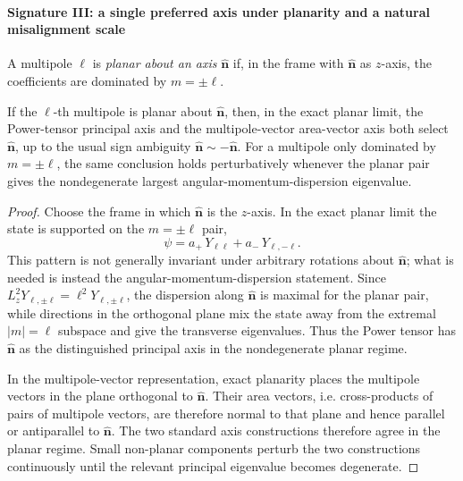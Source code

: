 \documentclass[12pt,a4paper]{article}
\begin{document}
\paragraph{Signature III: a single preferred axis under planarity and a natural misalignment scale}
\label{p8:subsec:bh-axis}

\begin{definition}
\label{p8:def:bh-planar}
A multipole $\ell$ is \emph{planar about an axis} $\hat{\mathbf n}$ if, in the frame with
$\hat{\mathbf n}$ as $z$-axis, the coefficients are dominated by $m=\pm\ell$.
\end{definition}


\begin{proposition}
\label{p8:prop:bh-bridge}
If the \(\ell\)-th multipole is planar about \(\hat{\mathbf n}\), then, in the exact planar limit, the Power-tensor principal axis and the multipole-vector area-vector axis both select \(\hat{\mathbf n}\), up to the usual sign ambiguity \(\hat{\mathbf n}\sim-\hat{\mathbf n}\).  For a multipole only dominated by \(m=\pm\ell\), the same conclusion holds perturbatively whenever the planar pair gives the nondegenerate largest angular-momentum-dispersion eigenvalue.
\end{proposition}
\begin{proof}
Choose the frame in which \(\hat{\mathbf n}\) is the \(z\)-axis.  In the exact planar limit the state is supported on the \(m=\pm\ell\) pair,
\[
\psi=a_+\,Y_{\ell\ell}+a_-\,Y_{\ell,-\ell}.
\]
This pattern is not generally invariant under arbitrary rotations about \(\hat{\mathbf n}\); what is needed is instead the angular-momentum-dispersion statement.  Since \(L_z^2Y_{\ell,\pm\ell}=\ell^2Y_{\ell,\pm\ell}\), the dispersion along \(\hat{\mathbf n}\) is maximal for the planar pair, while directions in the orthogonal plane mix the state away from the extremal \(|m|=\ell\) subspace and give the transverse eigenvalues.  Thus the Power tensor has \(\hat{\mathbf n}\) as the distinguished principal axis in the nondegenerate planar regime.

In the multipole-vector representation, exact planarity places the multipole vectors in the plane orthogonal to \(\hat{\mathbf n}\).  Their area vectors, i.e. cross-products of pairs of multipole vectors, are therefore normal to that plane and hence parallel or antiparallel to \(\hat{\mathbf n}\).  The two standard axis constructions therefore agree in the planar regime.  Small non-planar components perturb the two constructions continuously until the relevant principal eigenvalue becomes degenerate.
\end{proof}
\end{document}
